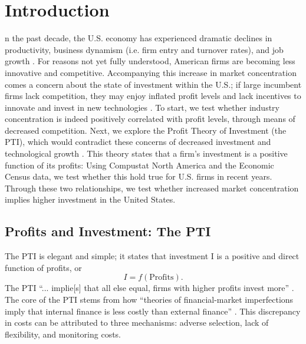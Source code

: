 %
%
\let\textcircled=\pgftextcircled
\chapter{Introduction}
\label{chap:intro}

n the past decade, the U.S. economy has experienced dramatic declines in productivity, business dynamism (i.e. firm entry and turnover rates), and job growth \cite[Baily and Montalbano, 2016]{Baily2016}. For reasons not yet fully understood, American firms are becoming less innovative and competitive. Accompanying this increase in market concentration comes a concern about the state of investment within the U.S.; if large incumbent firms lack competition, they may enjoy inflated profit levels and lack incentives to innovate and invest in new technologies \cite[Alesina et al., 2005]{Alesina2005}. To start, we test whether industry concentration is indeed positively correlated with profit levels, through means of decreased competition. Next, we explore the Profit Theory of Investment (the PTI), which would contradict these concerns of decreased investment and technological growth \cite[Merling, 2016]{CEPR2016}. This theory states that a firm’s investment is a positive function of its profits: Using Compustat North America and the Economic Census data, we test whether this hold true for U.S. firms in recent years. Through these two relationships, we test whether increased market concentration implies higher investment in the United States.\\

\section{Profits and Investment: The PTI}
\label{sec:sec01}

The PTI is elegant and simple; it states that investment I is a positive and direct function of profits, or
\begin{equation}
	I = f(\text{Profits}).
\end{equation}
The PTI “... implie[s] that all else equal, firms with higher profits invest more” \cite[Romer, 2012]{Romer2012}. The core of the PTI stems from how “theories of financial-market imperfections imply that internal finance is less costly than external finance” \cite[Romer, 2012]{Romer2012}. This discrepancy in costs can be attributed to three mechanisms: adverse selection, lack of flexibility, and monitoring costs. \\

